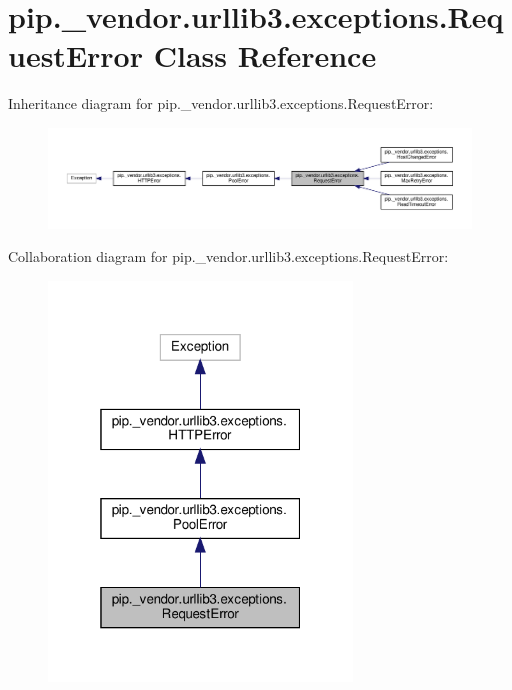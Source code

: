 \hypertarget{classpip_1_1__vendor_1_1urllib3_1_1exceptions_1_1RequestError}{}\section{pip.\+\_\+vendor.\+urllib3.\+exceptions.\+Request\+Error Class Reference}
\label{classpip_1_1__vendor_1_1urllib3_1_1exceptions_1_1RequestError}


Inheritance diagram for pip.\+\_\+vendor.\+urllib3.\+exceptions.\+Request\+Error\+:
\nopagebreak
\begin{figure}[H]
\begin{center}
\leavevmode
\includegraphics[width=350pt]{classpip_1_1__vendor_1_1urllib3_1_1exceptions_1_1RequestError__inherit__graph}
\end{center}
\end{figure}


Collaboration diagram for pip.\+\_\+vendor.\+urllib3.\+exceptions.\+Request\+Error\+:
\nopagebreak
\begin{figure}[H]
\begin{center}
\leavevmode
\includegraphics[width=229pt]{classpip_1_1__vendor_1_1urllib3_1_1exceptions_1_1RequestError__coll__graph}
\end{center}
\end{figure}

